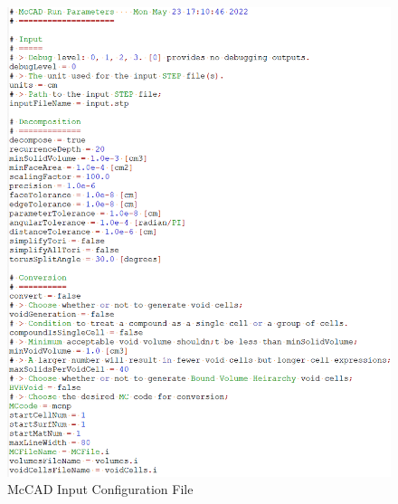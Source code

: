 \documentclass[letterpaper, 12 pt]{report}
\begin{document}
	\begin{figure}[h]
		\centering
		\includegraphics[scale=0.6]{figures/configFile.png}
		\caption{McCAD Input Configuration File}
		\label{fig:config}
	\end{figure}
\end{document}
